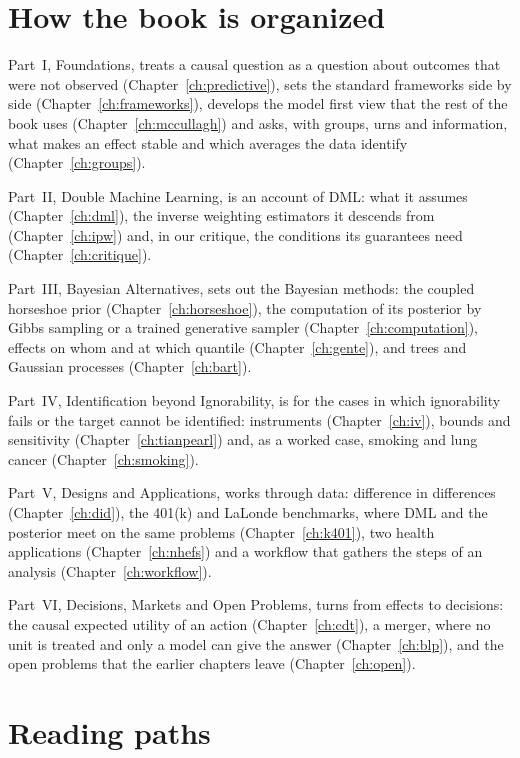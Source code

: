 \section*{How the book is organized}

Part~I, Foundations, treats a causal question as a question about outcomes that were not observed (Chapter~\ref{ch:predictive}), sets the standard frameworks side by side (Chapter~\ref{ch:frameworks}), develops the model first view that the rest of the book uses (Chapter~\ref{ch:mccullagh}) and asks, with groups, urns and information, what makes an effect stable and which averages the data identify (Chapter~\ref{ch:groups}).

Part~II, Double Machine Learning, is an account of DML: what it assumes (Chapter~\ref{ch:dml}), the inverse weighting estimators it descends from (Chapter~\ref{ch:ipw}) and, in our critique, the conditions its guarantees need (Chapter~\ref{ch:critique}).

Part~III, Bayesian Alternatives, sets out the Bayesian methods: the coupled horseshoe prior (Chapter~\ref{ch:horseshoe}), the computation of its posterior by Gibbs sampling or a trained generative sampler (Chapter~\ref{ch:computation}), effects on whom and at which quantile (Chapter~\ref{ch:gente}), and trees and Gaussian processes (Chapter~\ref{ch:bart}).

Part~IV, Identification beyond Ignorability, is for the cases in which ignorability fails or the target cannot be identified: instruments (Chapter~\ref{ch:iv}), bounds and sensitivity (Chapter~\ref{ch:tianpearl}) and, as a worked case, smoking and lung cancer (Chapter~\ref{ch:smoking}).

Part~V, Designs and Applications, works through data: difference in differences (Chapter~\ref{ch:did}), the 401(k) and LaLonde benchmarks, where DML and the posterior meet on the same problems (Chapter~\ref{ch:k401}), two health applications (Chapter~\ref{ch:nhefs}) and a workflow that gathers the steps of an analysis (Chapter~\ref{ch:workflow}).

Part~VI, Decisions, Markets and Open Problems, turns from effects to decisions: the causal expected utility of an action (Chapter~\ref{ch:cdt}), a merger, where no unit is treated and only a model can give the answer (Chapter~\ref{ch:blp}), and the open problems that the earlier chapters leave (Chapter~\ref{ch:open}).

\section*{Reading paths}

